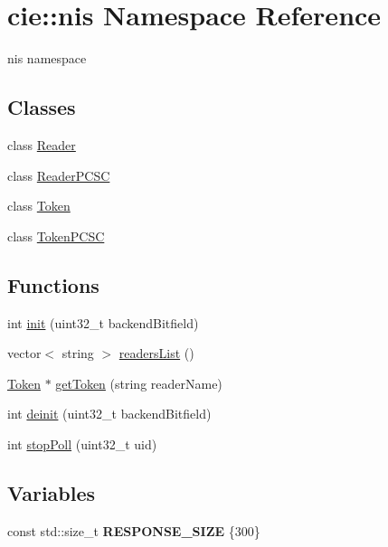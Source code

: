 \hypertarget{namespacecie_1_1nis}{\section{cie\-:\-:nis Namespace Reference}
\label{namespacecie_1_1nis}
}


nis namespace  


\subsection*{Classes}
\begin{DoxyCompactItemize}
\item 
class \hyperlink{classcie_1_1nis_1_1Reader}{Reader}
\item 
class \hyperlink{classcie_1_1nis_1_1ReaderPCSC}{Reader\-P\-C\-S\-C}
\item 
class \hyperlink{classcie_1_1nis_1_1Token}{Token}
\item 
class \hyperlink{classcie_1_1nis_1_1TokenPCSC}{Token\-P\-C\-S\-C}
\end{DoxyCompactItemize}
\subsection*{Functions}
\begin{DoxyCompactItemize}
\item 
int \hyperlink{namespacecie_1_1nis_abcdd144762aaa78abbf48a4252ee15e5}{init} (uint32\-\_\-t backend\-Bitfield)
\item 
vector$<$ string $>$ \hyperlink{namespacecie_1_1nis_a90d4445f8f3cc7ab7ea75b8c70aeaf63}{readers\-List} ()
\item 
\hyperlink{classcie_1_1nis_1_1Token}{Token} $\ast$ \hyperlink{namespacecie_1_1nis_aadf97fb070ca1d79e93f802d8de769e6}{get\-Token} (string reader\-Name)
\item 
int \hyperlink{namespacecie_1_1nis_a0c20f013bbac3f773e89a57591af68a9}{deinit} (uint32\-\_\-t backend\-Bitfield)
\item 
int \hyperlink{namespacecie_1_1nis_aa031abccb193d600ad1cd71b414abafa}{stop\-Poll} (uint32\-\_\-t uid)
\end{DoxyCompactItemize}
\subsection*{Variables}
\begin{DoxyCompactItemize}
\item 
\hypertarget{namespacecie_1_1nis_a87d8cc437c39bc9b1462464cc73b9e34}{const std\-::size\-\_\-t {\bfseries R\-E\-S\-P\-O\-N\-S\-E\-\_\-\-S\-I\-Z\-E} \{300\}}\label{namespacecie_1_1nis_a87d8cc437c39bc9b1462464cc73b9e34}

\end{DoxyCompactItemize}


